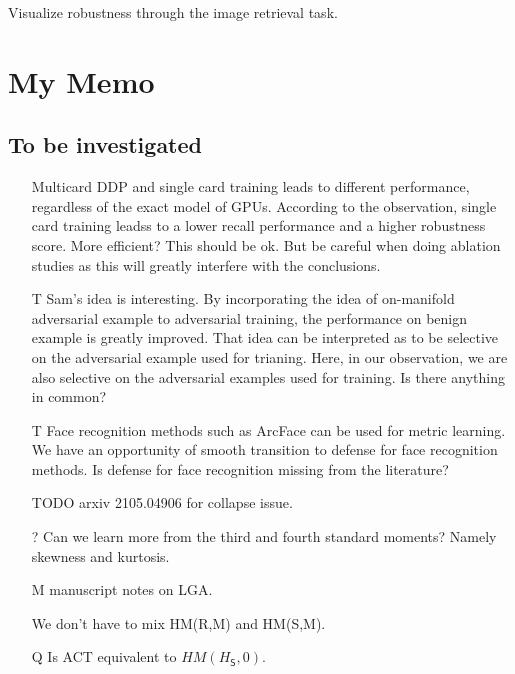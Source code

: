 Visualize robustness through the image retrieval task.

\section{My Memo}

\subsection{To be investigated}

\begin{itemize}
	
	\item [\xmark] Multicard DDP and single card training leads to different
		performance, regardless of the exact model of GPUs.
		According to the observation, single card training leadss to a lower
		recall performance and a higher robustness score.
		More efficient? This should be ok.
		But be careful when doing ablation studies as this will greatly
		interfere with the conclusions.
	
	\item [T] Sam's idea is interesting. By incorporating the idea of
		on-manifold adversarial example to adversarial training, the
		performance on benign example is greatly improved.
		That idea can be interpreted as to be selective on the adversarial
		example used for trianing.
		Here, in our observation, we are also selective on the adversarial
		examples used for training.
		Is there anything in common?

	\item [T] Face recognition methods such as ArcFace can be used for
		metric learning.
		We have an opportunity of smooth transition to defense for face
		recognition methods.
		Is defense for face recognition missing from the literature?

	\item [TODO] arxiv 2105.04906 for collapse issue.

	\item [?] Can we learn more from the third and fourth standard moments?
		Namely skewness and kurtosis.
	
	\item [M] manuscript notes on LGA.

	\item [\cmark] We don't have to mix HM(R,M) and HM(S,M).

	\item [Q] Is ACT equivalent to $HM(H_\mathsf{S},0)$.


\end{itemize}
